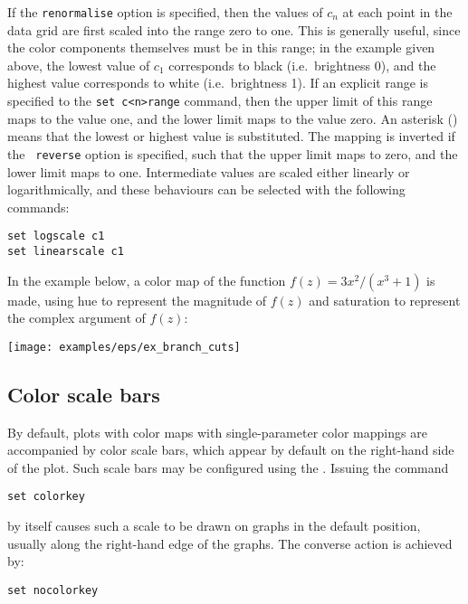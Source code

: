 \noindent If the {\tt renor\-malise} option is specified, then the values of
$c_n$ at each point in the data grid are first scaled into the range zero to
one. This is generally useful, since the color components themselves must be
in this range; in the example given above, the lowest value of $c_1$
corresponds to black (i.e.\ brightness 0), and the highest value corresponds to
white (i.e.\ brightness 1). If an explicit range is specified to the {\tt set
c<n>range} command, then the upper limit of this range maps to the value one,
and the lower limit maps to the value zero. An asterisk ({\tt *}) means that
the lowest or highest value is substituted. The mapping is inverted if the {\tt
reverse} option is specified, such that the upper limit maps to zero, and the
lower limit maps to one.  Intermediate values are scaled either linearly or
logarithmically, and these behaviours can be selected with the following
commands:
\begin{verbatim}
set logscale c1
set linearscale c1
\end{verbatim}

In the example below, a color map of the function $f(z)=3x^2/(x^3+1)$ is made,
using hue to represent the magnitude of $f(z)$ and saturation to represent the
complex argument of $f(z)$:

\vspace{2mm}

\vspace{2mm}
\centerline{\texttt{[image: examples/eps/ex\_branch\_cuts]}}

\subsection{Color scale bars}

By default, plots with color maps with single-parameter color mappings are
accompanied by color scale bars, which appear by default on the right-hand
side of the plot. Such scale bars may be configured using the . Issuing the command

\begin{verbatim}
set colorkey
\end{verbatim}

\noindent by itself causes such a scale to be drawn on graphs in the default
position, usually along the right-hand edge of the graphs. The converse action
is achieved by:

\begin{verbatim}
set nocolorkey
\end{verbatim}


